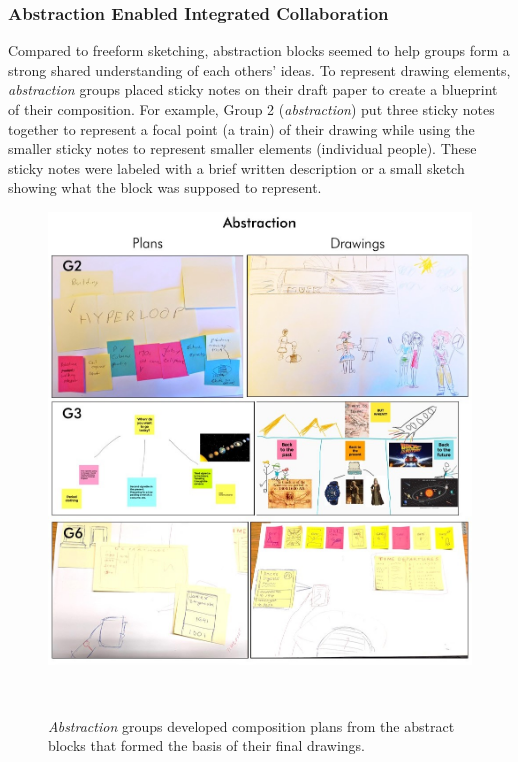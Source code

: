\subsubsection{Abstraction Enabled Integrated Collaboration} 
Compared to freeform sketching, abstraction blocks seemed to help groups form a strong shared understanding of each others' ideas. To represent drawing elements, \textit{abstraction} groups placed sticky notes on their draft paper to create a blueprint of their composition. For example, Group 2 (\textit{abstraction}) put three sticky notes together to represent a focal point (a train) of their drawing while using the smaller sticky notes to represent smaller elements (individual people). These sticky notes were labeled with a brief written description or a small sketch showing what the block was supposed to represent.

\begin{figure}
\centering
  \vspace{-0.2in}
\includegraphics[width=\textwidth]{abstraction/figures/abs.jpg}
\vspace{-0.3in}
  \caption{\textit{Abstraction} groups developed composition plans from the abstract blocks that formed the basis of their final drawings.}
  ~\label{fig:abs_drawings}
  \vspace{-0.2in}
\end{figure}

